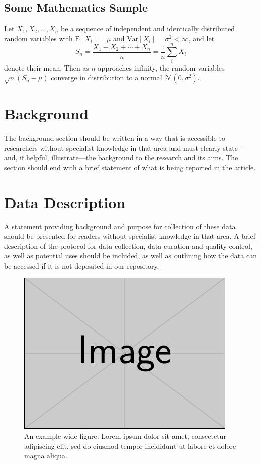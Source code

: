 \documentclass[a4paper,num-refs]{oup-contemporary}
\begin{document}
\subsection{Some Mathematics Sample}

Let $X_1, X_2, \ldots, X_n$ be a sequence of independent and identically distributed random variables with $\text{E}[X_i] = \mu$ and $\text{Var}[X_i] = \sigma^2 < \infty$, and let
%
\begin{equation}
S_n = \frac{X_1 + X_2 + \cdots + X_n}{n}
      = \frac{1}{n}\sum_{i}^{n} X_i
\end{equation}
%
denote their mean. Then as $n$ approaches infinity, the random variables $\sqrt{n}(S_n - \mu)$ converge in distribution to a normal $\mathcal{N}(0, \sigma^2)$.


\section{Background}
\label{sec:background}

The background section should be written in a way that is accessible to researchers without specialist knowledge in that area and must clearly state---and, if helpful, illustrate---the background to the research and its aims. The section should end with a brief statement of what is being reported in the article.


\section{Data Description}

A statement providing background and purpose for collection of these data should be presented for readers without specialist knowledge in that area. A brief description of the protocol for data collection, data curation and quality control, as well as potential uses should be included, as well as outlining how the data can be accessed if it is not deposited in our repository.

\begin{figure}%
\centering
\includegraphics[width=.7\textwidth]{example-image}
\caption{An example wide figure. Lorem ipsum dolor sit amet, consectetur adipiscing elit, sed do eiusmod tempor incididunt ut labore et dolore magna aliqua.
}\label{fig:example:wide}
\end{figure}
\end{document}
